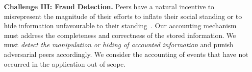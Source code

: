 \textbf{Challenge III: Fraud Detection.}
Peers have a natural incentive to misrepresent the magnitude of their efforts to inflate their social standing or to hide information unfavourable to their standing~\cite{meulpolder2009bartercast}.
Our accounting mechanism must address the completeness and correctness of the stored information.
We must \emph{detect the manipulation or hiding of accounted information} and punish adversarial peers accordingly.
We consider the accounting of events that have not occurred in the application out of scope.






